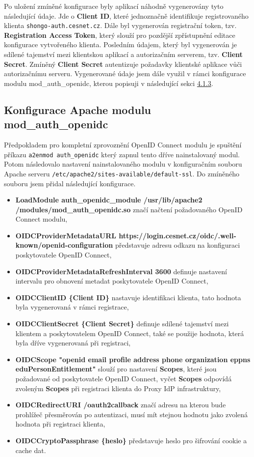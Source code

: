 \documentclass[
  printed, %
  twoside, %
  table,   %
  nolof,     %
  nolot,     %
]{fithesis3}
\begin{document}
Po uložení zmíněné konfigurace byly aplikací náhodně vygenerovány tyto následující údaje. Jde o \textbf{Client ID}, které jednoznačně identifikuje registrovaného klienta \texttt{shongo-auth.cesnet.cz}. Dále byl vygenerován registrační token, tzv. \textbf{Registration Access Token}, který slouží pro pozdější zpřístupnění editace konfigurace vytvořeného klienta. Posledním údajem, který byl vygenerován je sdílené tajemství mezi klientskou aplikací a autorizačním serverem, tzv. \textbf{Client Secret}. Zmíněný \textbf{Client Secret} autentizuje požadavky klientské aplikace vůči autorizačnímu serveru. Vygenerované údaje jsem dále využil v rámci konfigurace modulu mod\_auth\_openidc, kterou popisuji v následující sekci \hyperref[sec:mod-conf]{4.1.3}.

\subsection{Konfigurace Apache modulu mod\_auth\_openidc} 
\label{sec:mod-conf}
Předpokladem pro kompletní zprovoznění OpenID Connect modulu je spuštění příkazu \texttt{a2enmod auth\_openidc} který zapnul tento dříve nainstalovaný modul. Potom následovalo nastavení nainstalovaného modulu v konfiguračním souboru Apache serveru \texttt{/etc/apache2/sites-available/default-ssl}. Do zmíněného souboru jsem přidal následující konfigurace.

\begin{itemize}
    \item \textbf{LoadModule auth\_openidc\_module /usr/lib/apache2\\ /modules/mod\_auth\_openidc.so} značí načtení požadovaného OpenID Connect modulu, 
    \item \textbf{OIDCProviderMetadataURL https://login.cesnet.cz/oidc/.well-known/openid-configuration} představuje adresu odkazu na konfiguraci poskytovatele OpenID Connect, 
    \item \textbf{OIDCProviderMetadataRefreshInterval 3600} definuje nastavení intervalu pro obnovení metadat poskytovatele OpenID Connect, 
    \item \textbf{OIDCClientID \{Client ID\}} nastavuje identifikaci klienta, tato hodnota byla vygenerovaná v rámci registrace,
    \item \textbf{OIDCClientSecret \{Client Secret\}} definuje sdílené tajemství mezi klientem a poskytovatelem OpenID Connect, také se použije hodnota, která byla dříve vygenerovaná při registraci,
    \item \textbf{OIDCScope "openid email profile address phone organization eppns eduPersonEntitlement"} slouží pro nastavení \textbf{Scopes}, které jsou požadované od poskytovatele OpenID Connect, vyčet \textbf{Scopes} odpovídá zvoleným \textbf{Scopes} při registraci klienta do Proxy IdP infrastruktury,
    \item \textbf{OIDCRedirectURI /oauth2callback} značí adresu na kterou bude prohlížeč přesměrován po autentizaci, musí mít stejnou hodnotu jako zvolená hodnota při registraci klienta, 
    \item \textbf{OIDCCryptoPassphrase \{heslo\}} představuje heslo pro šifrování cookie a cache dat. 
\end{itemize}
\end{document}
